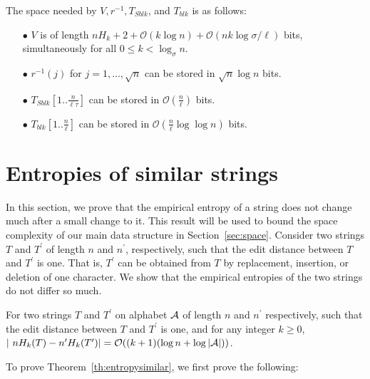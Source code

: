 \documentclass{llncs}
\newcommand{\Order}{\mathcal{O}}
\begin{document}
\begin{lemma}\label{lem:FV}
The space needed by $V, r^{-1}, T_{Sblk}$, and $T_{blk}$ is as follows:
\begin{itemize}
\item[{\raise0.3pt\hbox{$\bullet$}}]
$V$ is of length $n H_k + 2 + \Order(k \log n) + \Order(n k \log \sigma / \ell)$ bits, simultaneously for all $0 \le k < \log_\sigma n$.
\item[{\raise0.3pt\hbox{$\bullet$}}]
$r^{-1}(j)$ for $j=1, \ldots, \sqrt{n}$ can be stored in
$\sqrt{n} \log n$ bits.
\item[{\raise0.3pt\hbox{$\bullet$}}]
$T_{Sblk}[1..\frac{n}{\ell \tau}]$ can be stored in $\Order(\frac{n}{\ell})$ bits.
\item[{\raise0.3pt\hbox{$\bullet$}}]
$T_{blk}[1..\frac{n}{\ell}]$ can be stored in $\Order(\frac{n}{\ell} \log\log n)$ bits.
\end{itemize}
\end{lemma}





\section{Entropies of similar strings}\label{sec:entropysimilar}

In this section, we prove that the empirical entropy of a string does not
change much after a small change to it.
This result will be used to bound the space complexity of our main
data structure in Section~\ref{sec:space}.
Consider two strings $T$ and $T^\prime$ of length $n$ and $n^\prime$,
respectively, such that the edit distance between $T$ and $T^\prime$ is one.
That is, $T^\prime$ can be obtained from $T$ by replacement, insertion, or deletion of one character.
We show that the empirical entropies of the two strings
do not differ so much.
\begin{theorem}\label{th:entropysimilar}
For two strings $T$ and $T^\prime$ on alphabet ${\cal A}$
of length $n$ and $n^\prime$ respectively,
such that the edit distance between $T$ and $T^\prime$ is one, and for any integer $k \ge 0$,
$\left| \ n H_k(T) - n^\prime H_k(T^\prime) \right| = \Order((k+1) (\log n + \log |{\cal A}|))$.
\end{theorem}

To prove Theorem~\ref{th:entropysimilar}, we first prove the following:
\end{document}
